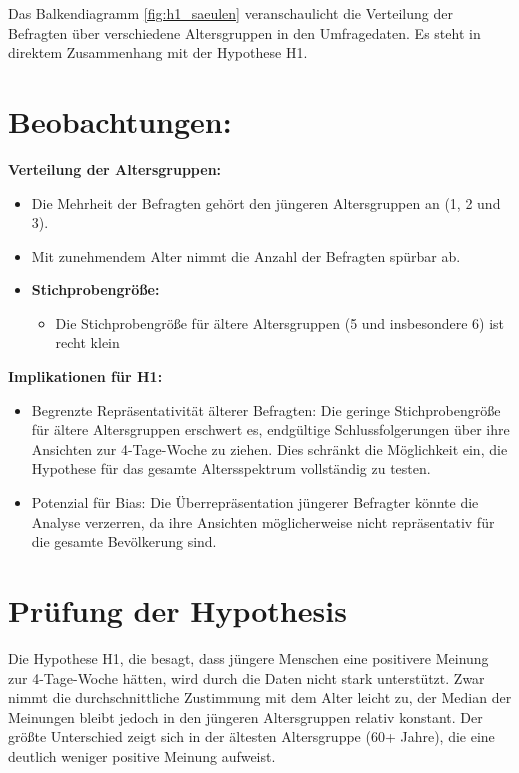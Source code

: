 Das Balkendiagramm \ref*{fig:h1_saeulen} veranschaulicht die Verteilung der Befragten über verschiedene Altersgruppen in den 
Umfragedaten. Es steht in direktem Zusammenhang mit der Hypothese H1.

\section{Beobachtungen:}

\textbf{Verteilung der Altersgruppen:}
\begin{itemize}
    \item Die Mehrheit der Befragten gehört den jüngeren Altersgruppen an (1, 2 und 3).
    \item Mit zunehmendem Alter nimmt die Anzahl der Befragten spürbar ab.
\end{itemize}

\begin{itemize}
    \item \textbf{Stichprobengröße:}
    \begin{itemize}
        \item Die Stichprobengröße für ältere Altersgruppen (5 und insbesondere 6) ist recht klein
    \end{itemize}
\end{itemize}

\textbf{Implikationen für H1:}
\begin{itemize}
    \item Begrenzte Repräsentativität älterer Befragten: Die geringe Stichprobengröße für ältere 
    Altersgruppen erschwert es, endgültige Schlussfolgerungen über ihre Ansichten zur 4-Tage-Woche zu 
    ziehen. Dies schränkt die Möglichkeit ein, die Hypothese für das gesamte Altersspektrum vollständig 
    zu testen.
    \item Potenzial für Bias: Die Überrepräsentation jüngerer Befragter könnte die Analyse verzerren, 
    da ihre Ansichten möglicherweise nicht repräsentativ für die gesamte Bevölkerung sind.
\end{itemize}

\section{Prüfung der Hypothesis}
Die Hypothese H1, die besagt, dass jüngere Menschen eine positivere Meinung zur 4-Tage-Woche hätten, 
wird durch die Daten nicht stark unterstützt. Zwar nimmt die durchschnittliche Zustimmung mit dem Alter 
leicht zu, der Median der Meinungen bleibt jedoch in den jüngeren Altersgruppen relativ konstant. Der 
größte Unterschied zeigt sich in der ältesten Altersgruppe (60+ Jahre), die eine deutlich weniger 
positive Meinung aufweist.

